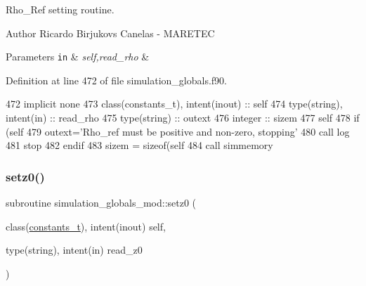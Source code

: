 Rho\+\_\+\+Ref setting routine. 

\begin{DoxyAuthor}{Author}
Ricardo Birjukovs Canelas -\/ M\+A\+R\+E\+T\+EC 
\end{DoxyAuthor}

\begin{DoxyParams}[1]{Parameters}
\mbox{\tt in}  & {\em self,read\+\_\+rho} & \\
\hline
\end{DoxyParams}


Definition at line 472 of file simulation\+\_\+globals.\+f90.


\begin{DoxyCode}
472     \textcolor{keywordtype}{implicit none}
473     \textcolor{keywordtype}{class}(constants\_t), \textcolor{keywordtype}{intent(inout)} :: self
474     \textcolor{keywordtype}{type}(string), \textcolor{keywordtype}{intent(in)} :: read\_rho
475     \textcolor{keywordtype}{type}(string) :: outext
476     \textcolor{keywordtype}{integer} :: sizem
477     self%
478     \textcolor{keywordflow}{if} (self%
479         outext=\textcolor{stringliteral}{'Rho\_ref must be positive and non-zero, stopping'}
480         \textcolor{keyword}{call }log%
481         stop
482 \textcolor{keywordflow}{    endif}
483     sizem = sizeof(self%
484     \textcolor{keyword}{call }simmemory%
\end{DoxyCode}
\mbox{\label{namespacesimulation__globals__mod_a64b1d91147c1cd5898fec8f23d56a65d}} 
\subsubsection{\texorpdfstring{setz0()}{setz0()}}
{\footnotesize\ttfamily subroutine simulation\+\_\+globals\+\_\+mod\+::setz0 (\begin{DoxyParamCaption}\item[{class(\mbox{\hyperlink{structsimulation__globals__mod_1_1constants__t}{constants\+\_\+t}}), intent(inout)}]{self,  }\item[{type(string), intent(in)}]{read\+\_\+z0 }\end{DoxyParamCaption})\hspace{0.3cm}{\ttfamily [private]}}



